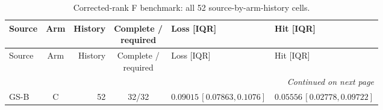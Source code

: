 \documentclass[10pt,a4paper]{article}
\begin{document}
\begingroup
\fontsize{9}{10.2}\selectfont
\setlength{\tabcolsep}{2.2pt}
\renewcommand{\arraystretch}{1.05}
\setlength{\LTpre}{2pt}
\setlength{\LTpost}{3pt}
\begin{longtable}{lcrcp{44mm}p{44mm}}
\caption{Corrected-rank F benchmark: all 52 source-by-arm-history cells.}\label{tab:v9-stability-f}\\
\toprule
Source & Arm & History & \shortstack{Complete /\\required} & Loss [IQR] & Hit [IQR]\\
\midrule
\endfirsthead
\toprule
Source & Arm & History & \shortstack{Complete /\\required} & Loss [IQR] & Hit [IQR]\\
\midrule
\endhead
\midrule
\multicolumn{6}{r}{\emph{Continued on next page}}\\
\endfoot
\bottomrule
\endlastfoot
GS-B & C & 52 & 32/32 & \(0.09015\,[0.07863,0.1076]\) & \(0.05556\,[0.02778,0.09722]\)\\

\end{longtable}
\end{document}
